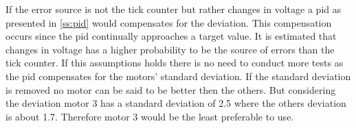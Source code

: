 If the error source is not the tick counter but rather changes in voltage a \gls{pid} as presented in \cref{ss:pid} would compensates for the deviation. This compensation occurs since the \gls{pid} continually approaches a target value. It is estimated that changes in voltage has a higher probability to be the source of errors than the tick counter. If this assumptions holds there is no need to conduct more tests as the \gls{pid} compensates for the motors' standard deviation. If the standard deviation is removed no motor can be said to be better then the others. But considering the deviation motor 3 has a standard deviation of 2.5 where the others deviation is about 1.7. Therefore motor 3 would be the least preferable to use.